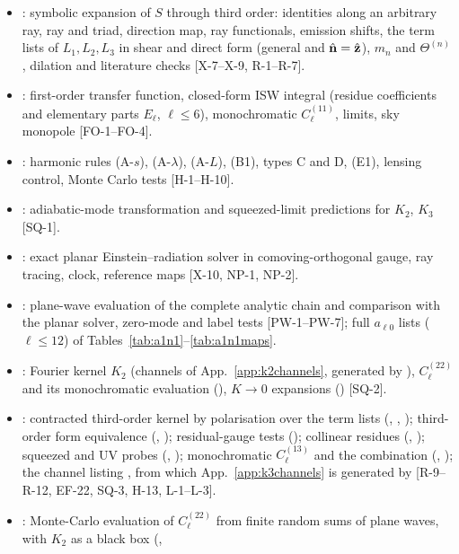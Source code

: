 \begin{itemize}
frame-rotation example [X-1--X-6].
\item {}: symbolic expansion of $S$ through third order: identities along an arbitrary ray, ray and triad, direction
map, ray functionals, emission shifts, the term lists of $L_1,L_2,L_3$ in shear and direct form (general and $\hat{\mathbf n}=\hat{\mathbf z}$), $m_n$ and
$\Theta^{(n)}$, dilation and literature checks [X-7--X-9, R-1--R-7].
\item {}: first-order transfer function, closed-form ISW integral (residue coefficients and elementary parts $E_\ell$,
$\ell\le6$), monochromatic $C^{(11)}_\ell$, limits, sky monopole [FO-1--FO-4].
\item {}: harmonic rules (A-$s$), (A-$\lambda$), (A-$L$), (B1), types C and D, (E1), lensing control, Monte Carlo
tests [H-1--H-10].
\item {}: adiabatic-mode transformation and squeezed-limit predictions for $K_2$, $K_3$ [SQ-1].
\item {}: exact planar Einstein--radiation solver in comoving-orthogonal gauge, ray tracing, clock, reference maps [X-10, NP-1, NP-2].
\item {}: plane-wave evaluation of the complete analytic chain and comparison with the planar solver, zero-mode and label
tests [PW-1--PW-7]; full $a_{\ell0}$ lists ($\ell\le12$) of Tables~\ref{tab:a1n1}--\ref{tab:a1n1maps}.
\item {}: Fourier kernel $K_2$ (channels of App.~\ref{app:k2channels}, generated by ), $C^{(22)}_\ell$ and
its monochromatic evaluation (), $K\to0$ expansions () [SQ-2].
\item {}: contracted third-order kernel by polarisation over the term lists (, ,
); third-order form equivalence (, ); residual-gauge tests (); collinear
residues (, ); squeezed and UV probes (, ); monochromatic $C^{(13)}_\ell$ and the
combination (, ); the channel listing , from which App.~\ref{app:k3channels} is generated by
 [R-9--R-12, EF-22, SQ-3, H-13, L-1--L-3].
\item {}: Monte-Carlo evaluation of $C^{(22)}_\ell$ from finite random sums of plane waves, with $K_2$ as a black box (,

\end{itemize}
